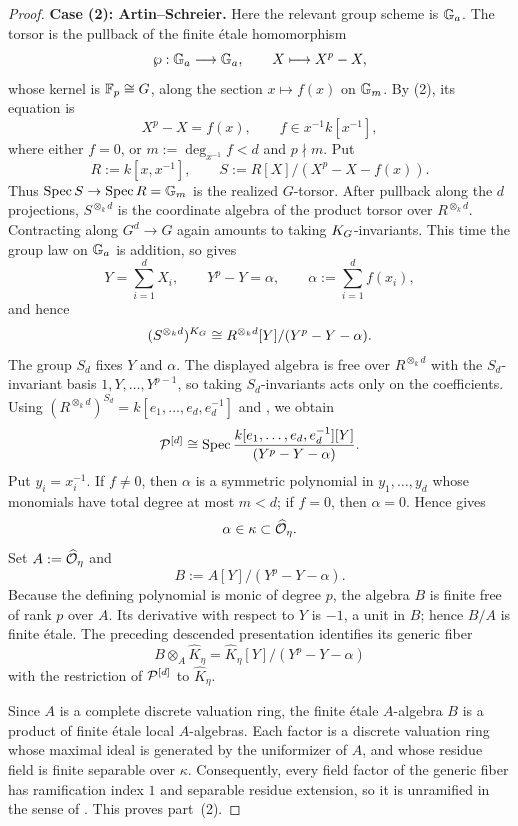 \begin{proof}
\medskip
\noindent\textbf{Case (2): Artin--Schreier.}
Here the relevant group scheme is $\mathbb{G}_a$. The torsor is the pullback of the
finite \'etale homomorphism
\[
    \wp:\mathbb{G}_a\longrightarrow\mathbb{G}_a,\qquad X\longmapsto X^p-X,
\]
whose kernel is $\mathbb{F}_p\cong G$, along the section $x\mapsto f(x)$ on
$\mathbb{G}_m$. By (2), its equation is
\[
    X^p-X=f(x),\qquad f\in x^{-1}k[x^{-1}],
\]
where either $f=0$, or $m:=\deg_{x^{-1}}f<d$ and $p\nmid m$. Put
\[
    R:=k[x,x^{-1}],\qquad
    S:=R[X]/(X^p-X-f(x)).
\]
Thus $\operatorname{Spec} S\to\operatorname{Spec} R=\mathbb{G}_m$ is the realized $G$-torsor. After pullback
along the $d$ projections, $S^{\otimes_k d}$ is the coordinate algebra of
the product torsor over $R^{\otimes_k d}$. Contracting along $G^d\to G$
again amounts to taking $K_{G}$-invariants. This time the group law on
$\mathbb{G}_a$ is addition, so  gives
\[
    Y=\sum_{i=1}^dX_i,\qquad
    Y^p-Y=\alpha,\qquad
    \alpha:=\sum_{i=1}^df(x_i),
\]
and hence
\[
    (S^{\otimes_k d})^{K_{G}}
       \cong
    R^{\otimes_k d}[Y]/(Y^p-Y-\alpha).
\]
The group $S_d$ fixes $Y$ and $\alpha$. The displayed algebra is free over
$R^{\otimes_k d}$ with the $S_d$-invariant basis
$1,Y,\dots,Y^{p-1}$, so taking $S_d$-invariants acts only on the
coefficients. Using $(R^{\otimes_k d})^{S_d}
=k[e_1,\dots,e_d,e_d^{-1}]$ and
, we obtain
\[
    \mathcal{P}^{[d]}\cong
    \operatorname{Spec}\frac{k[e_1,\dots,e_d,e_d^{-1}][Y]}{(Y^p-Y-\alpha)}.
\]
Put $y_i=x_i^{-1}$. If $f\neq0$, then $\alpha$ is a symmetric polynomial in
$y_1,\dots,y_d$ whose monomials have total degree at most $m<d$; if $f=0$,
then $\alpha=0$. Hence  gives
\[
    \alpha\in\kappa\subset\widehat{\mathcal{O}}_\eta.
\]
Set $A:=\widehat{\mathcal{O}}_\eta$ and
\[
    B:=A[Y]/(Y^p-Y-\alpha).
\]
Because the defining polynomial is monic of degree $p$, the algebra $B$ is
finite free of rank $p$ over $A$. Its derivative with respect to $Y$ is
$-1$, a unit in $B$; hence $B/A$ is finite \'etale. The preceding descended
presentation identifies its generic fiber
\[
    B\otimes_A\widehat K_\eta
       =\widehat K_\eta[Y]/(Y^p-Y-\alpha)
\]
with the restriction of $\mathcal{P}^{[d]}$ to $\widehat K_\eta$.

Since $A$ is a complete discrete valuation ring, the finite \'etale
$A$-algebra $B$ is a product of finite \'etale local $A$-algebras. Each
factor is a discrete valuation ring whose maximal ideal is generated by the
uniformizer of $A$, and whose residue field is finite separable over
$\kappa$. Consequently, every field factor of the generic fiber has
ramification index $1$ and separable residue extension, so it is unramified
in the sense of . This proves part~(2).


\end{proof}

